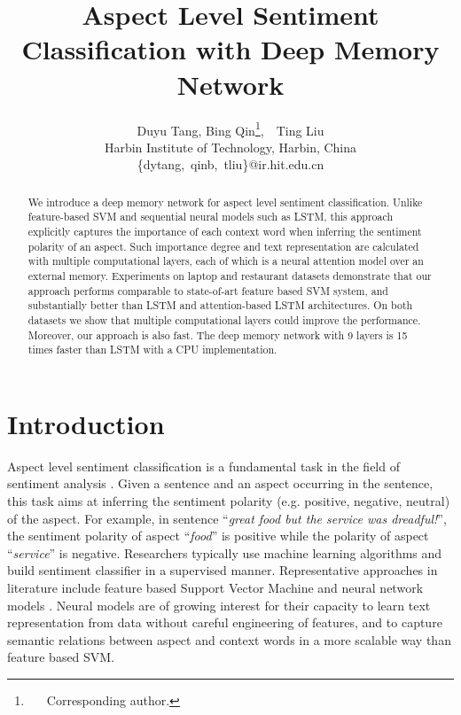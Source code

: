 \documentclass[11pt,letterpaper]{article}
\title{Aspect Level Sentiment Classification with Deep Memory Network}
\author{
	Duyu Tang, Bing Qin\thanks{\ \ \ Corresponding author.},\ \  Ting Liu\\
	Harbin Institute of Technology, Harbin, China\\
	\{dytang,\ qinb,\ tliu\}@ir.hit.edu.cn
}
\date{}
\begin{document}
\maketitle

\begin{abstract}
We introduce a deep memory network for aspect level sentiment classification.
Unlike feature-based SVM and sequential neural models such as LSTM, this approach explicitly captures the importance of each context word when inferring the sentiment polarity of an aspect.
Such importance degree and text representation are calculated with multiple computational layers, each of which is a neural attention model over an external memory. 
Experiments on laptop and restaurant datasets demonstrate that our approach performs comparable to state-of-art feature based SVM system,
and substantially better than LSTM and attention-based LSTM architectures.
On both datasets we show that multiple computational layers could improve the performance.
Moreover, our approach is also fast. The deep memory network with 9 layers is 15 times faster than LSTM with a CPU implementation.
\end{abstract}

\vspace{0.1cm}
\section{Introduction}
Aspect level sentiment classification is a fundamental task in the field of sentiment analysis  \cite{Pang2008,Liu2012a,Pontiki2014}.
Given a sentence and an aspect occurring in the sentence, this task aims at inferring the sentiment polarity (e.g. positive, negative, neutral) of the aspect. For example, in sentence ``\textit{great food but the service was dreadful!}'', the sentiment polarity of aspect ``\textit{food}'' is positive while the polarity of aspect ``\textit{service}'' is negative. 
Researchers typically use machine learning algorithms and build sentiment classifier in a supervised manner.
Representative approaches in literature include feature based Support Vector Machine
\cite{Kiritchenko2014-SemEval,Wagner2014-SemEval} and neural network models \cite{Dong2014,Lakkaraju2014aspect,Vo2015,Nguyen2015:EMNLP,Tang2015arxiv}.
Neural models are of growing interest for their capacity to learn text representation from data without careful engineering of features, and to capture semantic relations between aspect and context words in a more scalable way than feature based SVM.
\end{document}
